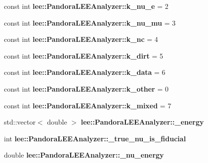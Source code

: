 \begin{DoxyCompactItemize}
\item 
\hypertarget{group__lee_ga9d7e6f745c8e67c74f49b904cbfa5d61}{const int {\bfseries lee\-::\-Pandora\-L\-E\-E\-Analyzer\-::k\-\_\-nu\-\_\-e} = 2}\label{group__lee_ga9d7e6f745c8e67c74f49b904cbfa5d61}

\item 
\hypertarget{group__lee_gaeeae8fe7055f10e2f6a30892926fd510}{const int {\bfseries lee\-::\-Pandora\-L\-E\-E\-Analyzer\-::k\-\_\-nu\-\_\-mu} = 3}\label{group__lee_gaeeae8fe7055f10e2f6a30892926fd510}

\item 
\hypertarget{group__lee_ga27261a8cfcfebab466011b2952a8969b}{const int {\bfseries lee\-::\-Pandora\-L\-E\-E\-Analyzer\-::k\-\_\-nc} = 4}\label{group__lee_ga27261a8cfcfebab466011b2952a8969b}

\item 
\hypertarget{group__lee_gafa596ee5d7a68568ce5371f17c38ee96}{const int {\bfseries lee\-::\-Pandora\-L\-E\-E\-Analyzer\-::k\-\_\-dirt} = 5}\label{group__lee_gafa596ee5d7a68568ce5371f17c38ee96}

\item 
\hypertarget{group__lee_ga00720d429d223c6bfd351b500b287517}{const int {\bfseries lee\-::\-Pandora\-L\-E\-E\-Analyzer\-::k\-\_\-data} = 6}\label{group__lee_ga00720d429d223c6bfd351b500b287517}

\item 
\hypertarget{group__lee_ga397f9459c5ff25721ca99fa9b9df4880}{const int {\bfseries lee\-::\-Pandora\-L\-E\-E\-Analyzer\-::k\-\_\-other} = 0}\label{group__lee_ga397f9459c5ff25721ca99fa9b9df4880}

\item 
\hypertarget{group__lee_ga75e327e4124da9ee9a1a95a4126be377}{const int {\bfseries lee\-::\-Pandora\-L\-E\-E\-Analyzer\-::k\-\_\-mixed} = 7}\label{group__lee_ga75e327e4124da9ee9a1a95a4126be377}

\item 
\hypertarget{group__lee_gaf64e85c1a6351ba43d787ae01d82f34e}{std\-::vector$<$ double $>$ {\bfseries lee\-::\-Pandora\-L\-E\-E\-Analyzer\-::\-\_\-energy}}\label{group__lee_gaf64e85c1a6351ba43d787ae01d82f34e}

\item 
\hypertarget{group__lee_ga0fb26f882cca04dd6e9d6162808365c8}{int {\bfseries lee\-::\-Pandora\-L\-E\-E\-Analyzer\-::\-\_\-true\-\_\-nu\-\_\-is\-\_\-fiducial}}\label{group__lee_ga0fb26f882cca04dd6e9d6162808365c8}

\item 
\hypertarget{group__lee_ga23ee0dccbe8495fa418cb6c0020c1643}{double {\bfseries lee\-::\-Pandora\-L\-E\-E\-Analyzer\-::\-\_\-nu\-\_\-energy}}\label{group__lee_ga23ee0dccbe8495fa418cb6c0020c1643}


\end{DoxyCompactItemize}
